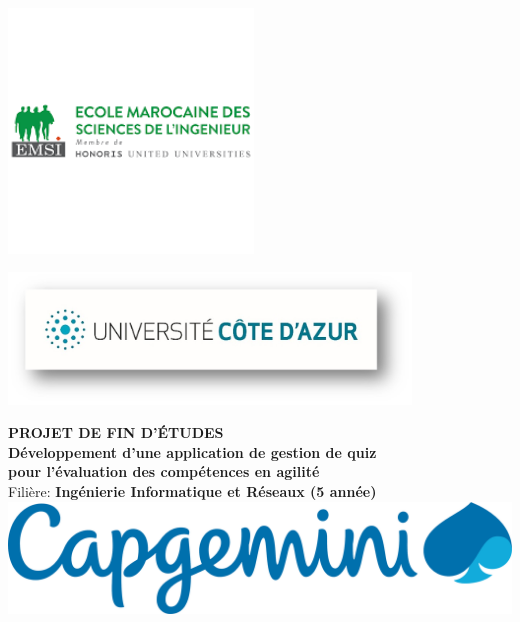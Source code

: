 \documentclass[12pt,a4paper]{report}
\begin{document}
\thispagestyle{empty} %

\begin{center}

\begin{minipage}{0.45\textwidth}\centering
  \includegraphics[height=6.5cm]{latex_media/media/logoemsi.png}
\end{minipage}\hfill
\begin{minipage}{0.45\textwidth}\centering
  \includegraphics[height=3.5cm]{latex_media/media/logo unica.jpg}
\end{minipage}

\vspace{1cm}

{\Large \textbf{PROJET DE FIN D'ÉTUDES}}\\[0.5cm]

{\Large \textbf{Développement d'une application de gestion de quiz \\
pour l'évaluation des compétences en agilité}}\\[1cm]

{\large Filière: \textbf{Ingénierie Informatique et Réseaux (5\ieme{} année)}}\\[1.2cm]

\includegraphics[height=3cm]{latex_media/media/image3.png}\\[0.4cm]


\end{center}
\end{document}
